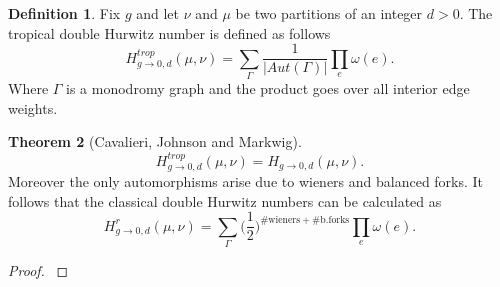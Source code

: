 \documentclass[12pt,a4paper,openright,twoside]{report}
\theoremstyle{definition} %
\newtheorem{theorem}{Theorem}[chapter]
\newtheorem{definition}[theorem]{Definition}
\begin{document}
\begin{definition}
Fix \(g\) and let \(\nu\) and \(\mu\) be two partitions of an integer \(d > 0\). The tropical double Hurwitz number is defined as follows
    \[
    H^{trop}_{g \to 0,d}(\mu,\nu) = \sum_{\Gamma} \frac{1}{|Aut(\Gamma)|} \prod_e \omega(e).
    \]
    Where \(\Gamma\) is a monodromy graph and the product goes over all interior edge weights.
\end{definition}

\begin{theorem}[Cavalieri, Johnson and Markwig]
    \[
    H^{trop}_{g \to 0,d}(\mu,\nu) = H_{g \to 0,d}(\mu,\nu).
    \]
    Moreover the only automorphisms arise due to wieners and balanced forks. It follows that the classical double Hurwitz numbers can be calculated as
    \[
    H^r_{g \to 0,d}(\mu,\nu) = \sum_{\Gamma} \biggl(\frac{1}{2}\biggr)^{\#\text{wieners} + \#\text{b.forks}} \prod_e \omega(e).
    \]
\end{theorem}

\begin{proof}
    \cite[Cor. 4.4, p. 247]{CJM10}
\end{proof}
\end{document}
